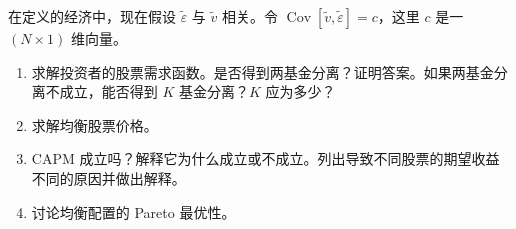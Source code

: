\par\noindent\begin{minipage}{\linewidth}
\begin{problem}
 在定义的经济中，现在假设 $\tilde{\varepsilon}$ 与 $\tilde{v}$ 相关。令 $\operatorname{Cov}[\tilde{v},\tilde{\varepsilon}]=c$，这里 $c$ 是一 $(N\times 1)$ 维向量。
\begin{enumerate}[label=(\alph*)]
    \item 求解投资者的股票需求函数。是否得到两基金分离？证明答案。如果两基金分离不成立，能否得到 $K$ 基金分离？$K$ 应为多少？
    \item 求解均衡股票价格。
    \item CAPM 成立吗？解释它为什么成立或不成立。列出导致不同股票的期望收益不同的原因并做出解释。
    \item 讨论均衡配置的 Pareto 最优性。
\end{enumerate}
\end{problem}
\end{minipage}\par
{}
